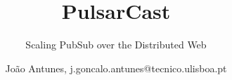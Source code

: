 \documentclass{./llncs2e/llncs}
\begin{document}
\title{PulsarCast}

\subtitle{Scaling PubSub over the Distributed Web}
\author{João Antunes, j.goncalo.antunes@tecnico.ulisboa.pt}

\maketitle

\setcounter{tocdepth}{2}
\makeatletter
\renewcommand*\l@author[2]{}
\renewcommand*\l@title[2]{}
\makeatletter



\clearpage
\tableofcontents
\clearpage

\pagestyle{plain}






\newpage
\appendix

\clearpage

%
%


\end{document}
